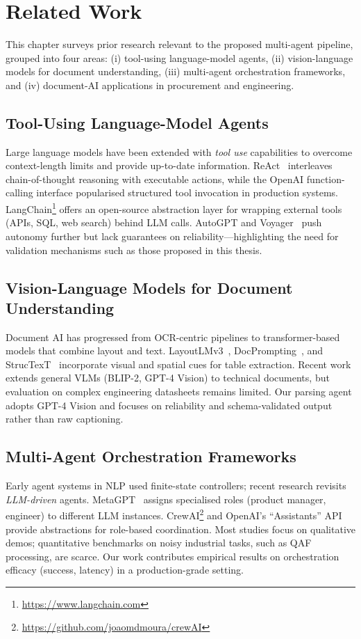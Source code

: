 \section{Related Work}
\label{chapter:relatedwork}

This chapter surveys prior research relevant to the proposed multi-agent pipeline, grouped into four areas: (i) tool-using language-model agents, (ii) vision-language models for document understanding, (iii) multi-agent orchestration frameworks, and (iv) document-AI applications in procurement and engineering.

\subsection{Tool-Using Language-Model Agents}
Large language models have been extended with \emph{tool use} capabilities to overcome context-length limits and provide up-to-date information.  
ReAct~\cite{yao2023react} interleaves chain-of-thought reasoning with executable actions, while the OpenAI function-calling interface popularised structured tool invocation in production systems.  
LangChain\footnote{\url{https://www.langchain.com}} offers an open-source abstraction layer for wrapping external tools (APIs, SQL, web search) behind LLM calls.  
AutoGPT and Voyager~\cite{wang2023voyager} push autonomy further but lack guarantees on reliability—highlighting the need for validation mechanisms such as those proposed in this thesis.

\subsection{Vision-Language Models for Document Understanding}
Document AI has progressed from OCR-centric pipelines to transformer-based models that combine layout and text.  
LayoutLMv3~\cite{xuhuang2022layoutlmv3}, DocPrompting~\cite{li2023docprompt}, and StrucTexT~\cite{li2021structext} incorporate visual and spatial cues for table extraction.  
Recent work extends general VLMs (BLIP-2, GPT-4 Vision) to technical documents, but evaluation on complex engineering datasheets remains limited.  
Our parsing agent adopts GPT-4 Vision and focuses on reliability and schema-validated output rather than raw captioning.

\subsection{Multi-Agent Orchestration Frameworks}
Early agent systems in NLP used finite-state controllers; recent research revisits \emph{LLM-driven} agents.  
MetaGPT~\cite{hong2023metagpt} assigns specialised roles (product manager, engineer) to different LLM instances.  
CrewAI\footnote{\url{https://github.com/joaomdmoura/crewAI}} and OpenAI’s “Assistants” API provide abstractions for role-based coordination.  
Most studies focus on qualitative demos; quantitative benchmarks on noisy industrial tasks, such as QAF processing, are scarce.  
Our work contributes empirical results on orchestration efficacy (success, latency) in a production-grade setting.

